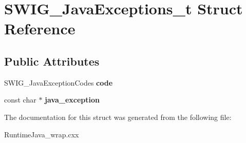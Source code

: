 \hypertarget{struct_s_w_i_g___java_exceptions__t}{}\section{S\+W\+I\+G\+\_\+\+Java\+Exceptions\+\_\+t Struct Reference}
\label{struct_s_w_i_g___java_exceptions__t}
\subsection*{Public Attributes}
\begin{DoxyCompactItemize}
\item 
\hypertarget{struct_s_w_i_g___java_exceptions__t_a04044dfc89f07ed39fe7bbb23f120d5a}{}\label{struct_s_w_i_g___java_exceptions__t_a04044dfc89f07ed39fe7bbb23f120d5a} 
S\+W\+I\+G\+\_\+\+Java\+Exception\+Codes {\bfseries code}
\item 
\hypertarget{struct_s_w_i_g___java_exceptions__t_a38dd5a9090f6d6c09f43d85536bc3154}{}\label{struct_s_w_i_g___java_exceptions__t_a38dd5a9090f6d6c09f43d85536bc3154} 
const char $\ast$ {\bfseries java\+\_\+exception}
\end{DoxyCompactItemize}


The documentation for this struct was generated from the following file\+:\begin{DoxyCompactItemize}
\item 
Runtime\+Java\+\_\+wrap.\+cxx\end{DoxyCompactItemize}
